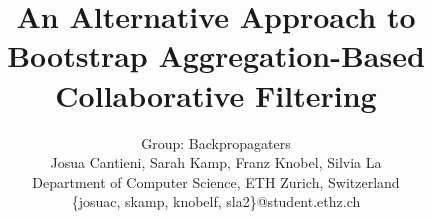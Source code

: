 \documentclass[10pt,conference,compsocconf]{IEEEtran}
\begin{document}
\title{An Alternative Approach to Bootstrap Aggregation-Based Collaborative Filtering}

\author{
    Group: Backpropagaters\\
    Josua Cantieni, Sarah Kamp, Franz Knobel, Silvia La\\
    Department of Computer Science, ETH Zurich, Switzerland\\
    \{josuac, skamp, knobelf, sla2\}@student.ethz.ch
}

\maketitle



\acresetall











\clearpage

\begin{figure}[p]
\end{figure}
\end{document}

